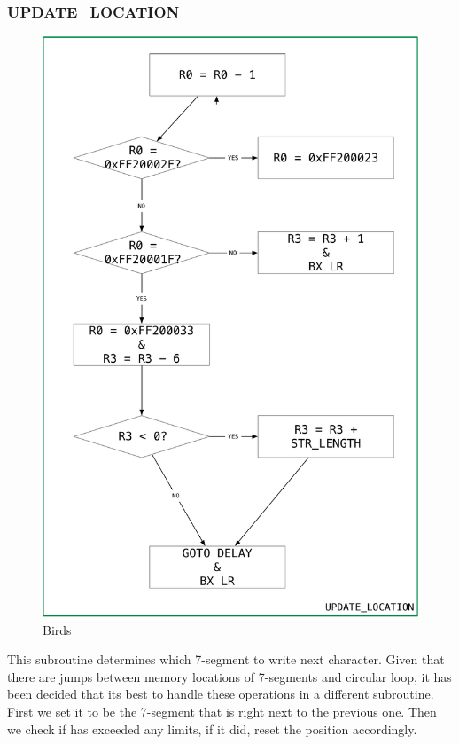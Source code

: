 \documentclass[titlepage]{article}
\begin{document}
	\subsubsection{UPDATE\_LOCATION}
	\begin{figure}
		\centering
		\includegraphics[scale=.2]{../images/update_location.pdf}
		\caption{Birds}
	\end{figure}
	This subroutine determines which 7-segment to write next character. Given that there are jumps between memory locations of 7-segments and circular loop, it has been decided that its best to handle these operations in a different subroutine. First we set it to be the 7-segment that is right next to the previous one. Then we check if has exceeded any limits, if it did, reset the position accordingly.
\end{document}
